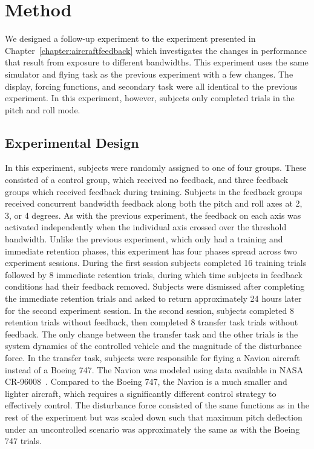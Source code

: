 \section{Method}

We designed a follow-up experiment to the experiment presented in Chapter~\ref{chapter:aircraftfeedback} which investigates the changes in performance that result from exposure to different bandwidths.
This experiment uses the same simulator and flying task as the previous experiment with a few changes.
The display, forcing functions, and secondary task were all identical to the previous experiment.
In this experiment, however, subjects only completed trials in the pitch and roll mode.

\subsection{Experimental Design}

In this experiment, subjects were randomly assigned to one of four groups.
These consisted of a control group, which received no feedback, and three feedback groups which received feedback during training.
Subjects in the feedback groups received concurrent bandwidth feedback along both the pitch and roll axes at 2, 3, or 4 degrees.
As with the previous experiment, the feedback on each axis was activated independently when the individual axis crossed over the threshold bandwidth.
Unlike the previous experiment, which only had a training and immediate retention phases, this experiment has four phases spread across two experiment sessions.
During the first session subjects completed 16 training trials followed by 8 immediate retention trials, during which time subjects in feedback conditions had their feedback removed.
Subjects were dismissed after completing the immediate retention trials and asked to return approximately 24 hours later for the second experiment session.
In the second session, subjects completed 8 retention trials without feedback, then completed 8 transfer task trials without feedback.
The only change between the transfer task and the other trials is the system dynamics of the controlled vehicle and the magnitude of the disturbance force.
In the transfer task, subjects were responsible for flying a Navion aircraft instead of a Boeing 747.
The Navion was modeled using data available in NASA CR-96008~\citep{teper1969aircraft}.
Compared to the Boeing 747, the Navion is a much smaller and lighter aircraft, which requires a significantly different control strategy to effectively control.
The disturbance force consisted of the same functions as in the rest of the experiment but was scaled down such that maximum pitch deflection under an uncontrolled scenario was approximately the same as with the Boeing 747 trials.

